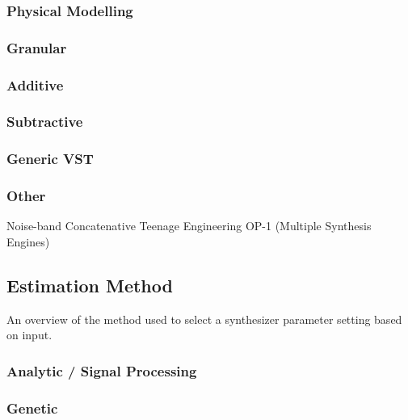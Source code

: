 \subsubsection{Physical Modelling}
\cite{vuori1993parameter}\cite{erkut2000extraction}\cite{liang2000recurrent}\cite{nackaerts2001parameter}\cite{riionheimo2003parameter}

\subsubsection{Granular}
\cite{fujinaga1994genetic}\cite{johnson1999exploring}

\subsubsection{Additive}
\cite{ethington1994seawave}\cite{horner1995envelope}\cite{horner1996piecewise}\cite{johnson2006timbre}\cite{mintz2007toward}

\subsubsection{Subtractive}
\cite{roth2011comparison}

\subsubsection{Generic VST}
\cite{yee2008synthbot}\cite{heise2009automatic}

\subsubsection{Other}
Noise-band \cite{chinen2007genesynth}
Concatenative \cite{stowell2010making}
Teenage Engineering OP-1 (Multiple Synthesis Engines) \cite{macret2013automatic}

\subsection{Estimation Method}
An overview of the method used to select a synthesizer parameter setting based on input.

\subsubsection{Analytic / Signal Processing}
\cite{justice1979analytic}\cite{beauchamp1982synthesis}\cite{payne1987microcomputer}\cite{ethington1994seawave}

\subsubsection{Genetic}
\cite{horner1993machine}\cite{fujinaga1994genetic}\cite{horner1995envelope}\cite{horner1995wavetable}\cite{riionheimo2003parameter}\cite{mandelis2003musical}\cite{mitchell2005frequency}\cite{mitchell2007evolutionary}
\cite{chinen2007genesynth}\cite{yee2008synthbot}\cite{roth2011comparison}\cite{macret2012automatic}\cite{hamadicharef2012intelligent}\cite{macret2013automatic}

